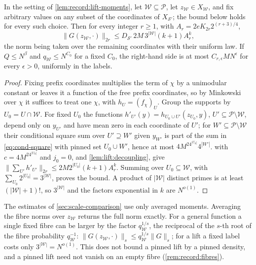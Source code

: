 \begin{corollary}\label{lem:record:conditional-moments}
In the setting of \cref{lem:record:lift-moments}, let
$\mathcal W\subseteq\mathcal P$, let $z_{\mathcal W}\in X_{\mathcal W}$, and fix arbitrary values on any subset of the coordinates of $X_{\mathcal S'}$; the bound below holds for every such choice. Then for every
integer $r\ge1$, with $A_r=2eK_{2r}2^{(r+3)/4}$,
\[
 \|G(z_{\mathcal W},\cdot)\|_{2r}\le D_{\mathcal S'}\,2M\,3^{|\mathcal W|}(k+1)A_r^k,
\]
the norm being taken over the remaining coordinates with their uniform law. If
$Q\le N^\beta$ and $q_{\mathcal W}\le N^{C_0}$ for a fixed $C_0$, the right-hand
side is at most $C_{r,\epsilon}MN^\epsilon$ for every $\epsilon>0$, uniformly in
the labels.
\end{corollary}

\begin{proof}
Fixing prefix coordinates multiplies the term of $\chi$ by a unimodular
constant or leaves it a function of the free prefix coordinates, so by
Minkowski over $\chi$ it suffices to treat one $\chi$, with $h_U=(f_\chi)_U$.
Group the supports by $U_0=U\cap\mathcal W$. For fixed $U_0$ the functions
$h'_{U'}(y)=h_{U_0\cup U'}(z_{U_0},y)$, $U'\subseteq\mathcal P\setminus\mathcal W$,
depend only on $y_{U'}$ and have mean zero in each coordinate of $U'$; for
$W'\subseteq\mathcal P\setminus\mathcal W$ their conditional square sum over
$U'\supseteq W'$ given $y_{W'}$ is part of the sum in \eqref{eq:cond-square} with
pinned set $U_0\cup W'$, hence at most $4M^24^{|U_0|}4^{|W'|}$.
 with $c=4M^24^{|U_0|}$ and $j_0=0$, and
\cref{lem:lift:decoupling}, give
$\|\sum_{U'}h'_{U'}\|_{2r}\le2M2^{|U_0|}(k+1)A_r^k$. Summing over
$U_0\subseteq\mathcal W$, with $\sum_{U_0}2^{|U_0|}=3^{|\mathcal W|}$, proves the
bound. A product of $|\mathcal W|$ distinct primes is at least
$(|\mathcal W|+1)!$, so $3^{|\mathcal W|}$ and the factors exponential in $k$ are
$N^{o(1)}$.
\end{proof}

\begin{remark}\label{rem:lift:fibres}
The estimates of \cref{sec:scale-comparison} use only averaged moments.
Averaging the fibre norms over $z_{\mathcal W}$ returns the full norm exactly.
For a general function a single fixed fibre can be larger by the factor
$q_{\mathcal W}^{1/s}$, the reciprocal of the $s$-th root of the fibre probability $q_{\mathcal W}^{-1}$:
$\|G(z_{\mathcal W},\cdot)\|_s\le q_{\mathcal W}^{1/s}\|G\|_s$; for a lift a
fixed label costs only $3^{|\mathcal W|}=N^{o(1)}$. This does not bound a pinned
lift by a pinned density, and a pinned lift need not vanish on an empty fibre
(\cref{rem:record:fibres}).
\end{remark}


